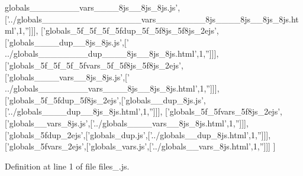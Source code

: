 \begin{DoxyCode}
{      globals\_\_\_\_\_\_\_\_vars\_\_\_\_8js\_\_8js\_8js.js'},[\textcolor{stringliteral}{'../globals\_\_\_\_\_\_\_\_\_\_\_\_\_\_\_\_vars\_\_\_\_\_\_\_\_8js\_\_\_\_8js\_\_8js\_8js.html'},1,\textcolor{stringliteral}{''}]]],
  [\textcolor{stringliteral}{'globals\_5f\_5f\_5f\_5fdup\_5f\_5f8js\_5f8js\_2ejs'},[\textcolor{stringliteral}{'globals\_\_\_\_dup\_\_8js\_8js.js'},[\textcolor{stringliteral}{'
      ../globals\_\_\_\_\_\_\_\_dup\_\_\_\_8js\_\_8js\_8js.html'},1,\textcolor{stringliteral}{''}]]],
  [\textcolor{stringliteral}{'globals\_5f\_5f\_5f\_5fvars\_5f\_5f8js\_5f8js\_2ejs'},[\textcolor{stringliteral}{'globals\_\_\_\_vars\_\_8js\_8js.js'},[\textcolor{stringliteral}{'
      ../globals\_\_\_\_\_\_\_\_vars\_\_\_\_8js\_\_8js\_8js.html'},1,\textcolor{stringliteral}{''}]]],
  [\textcolor{stringliteral}{'globals\_5f\_5fdup\_5f8js\_2ejs'},[\textcolor{stringliteral}{'globals\_\_dup\_8js.js'},[\textcolor{stringliteral}{'../globals\_\_\_\_dup\_\_8js\_8js.html'},1,\textcolor{stringliteral}{''}]]],
  [\textcolor{stringliteral}{'globals\_5f\_5fvars\_5f8js\_2ejs'},[\textcolor{stringliteral}{'globals\_\_vars\_8js.js'},[\textcolor{stringliteral}{'../globals\_\_\_\_vars\_\_8js\_8js.html'},1,\textcolor{stringliteral}{''}]]],
  [\textcolor{stringliteral}{'globals\_5fdup\_2ejs'},[\textcolor{stringliteral}{'globals\_dup.js'},[\textcolor{stringliteral}{'../globals\_\_dup\_8js.html'},1,\textcolor{stringliteral}{''}]]],
  [\textcolor{stringliteral}{'globals\_5fvars\_2ejs'},[\textcolor{stringliteral}{'globals\_vars.js'},[\textcolor{stringliteral}{'../globals\_\_vars\_8js.html'},1,\textcolor{stringliteral}{''}]]]
]
\end{DoxyCode}


Definition at line 1 of file files\+\_.\+js.

